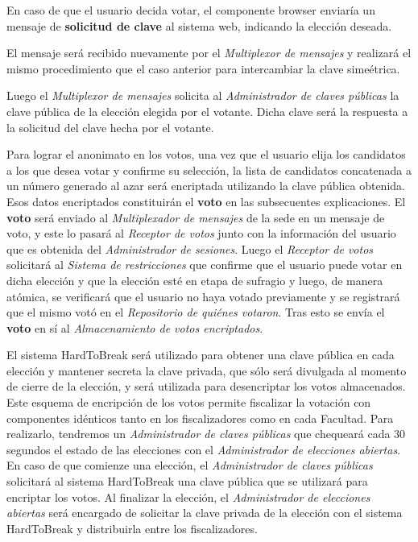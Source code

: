 En caso de que el usuario decida votar, el componente browser enviaría un mensaje de {\bf solicitud de clave} al sistema web, indicando la elección deseada. 

El mensaje será recibido nuevamente por el \emph{Multiplexor de mensajes} y realizar\'a el mismo procedimiento que el caso anterior para intercambiar la clave sime\'etrica.

Luego el \emph{Multiplexor de mensajes} solicita al \emph{Administrador de claves p\'ublicas} la clave p\'ublica de la elecci\'on elegida por el votante. Dicha clave ser\'a la respuesta a la solicitud del clave hecha por el votante.

Para lograr el anonimato en los votos, una vez que el usuario elija los candidatos a los que desea votar y confirme su selección, la lista de candidatos concatenada a un número generado al azar será encriptada utilizando la clave pública obtenida. 
Esos datos encriptados constituirán el {\bf voto} en las subsecuentes explicaciones. 
El {\bf voto} será enviado al \emph{Multiplexador de mensajes} de la sede en un mensaje de voto, y este lo pasar\'a al \emph{Receptor de votos} junto con la informaci\'on del usuario que es obtenida del \emph{Administrador de sesiones}. 
Luego el \emph{Receptor de votos} solicitará al \emph{Sistema de restricciones} que confirme que el usuario puede votar en dicha elección y que la elección esté en etapa de sufragio y luego, de manera atómica, se verificará que el usuario no haya votado previamente y se registrará que el mismo votó en el \emph{Repositorio de quiénes votaron}. Tras esto se envía el {\bf voto} en sí al \emph{Almacenamiento de votos encriptados}.

El sistema HardToBreak será utilizado para obtener una clave pública en cada elección y mantener secreta la clave privada, que sólo será divulgada al momento de cierre de la elección, y será utilizada para desencriptar los votos almacenados. 
Este esquema de encripción de los votos permite fiscalizar la votación con componentes idénticos tanto en los fiscalizadores como en cada Facultad. Para realizarlo, tendremos un \emph{Administrador de claves p\'ublicas} que chequear\'a cada 30 segundos el estado de las elecciones con el \emph{Administrador de elecciones abiertas}. En caso de que comienze una elecci\'on, el \emph{Administrador de claves p\'ublicas} solicitar\'a al sistema HardToBreak una clave p\'ublica que se utilizar\'a para encriptar los votos. Al finalizar la elecci\'on, el \emph{Administrador de elecciones abiertas} ser\'a encargado de solicitar la clave privada de la elecci\'on con el sistema HardToBreak y distribuirla entre los fiscalizadores.




